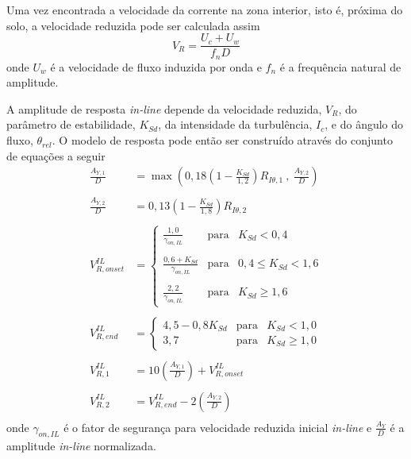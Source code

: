 Uma vez encontrada a velocidade da corrente na zona interior, isto é, próxima do solo, a velocidade reduzida pode ser calculada assim
\begin{equation}
\label{eq:jdsn-Vr}
V_R = \frac{U_c + U_w}{f_n D}
\end{equation}
onde $U_w$ é a velocidade de fluxo induzida por onda e $f_n$ é a frequência natural de amplitude.

A amplitude de resposta \textit{in-line} depende da velocidade reduzida, $V_R$, do parâmetro de estabilidade, $K_\mathit{Sd}$, da intensidade da turbulência, $\mathit{I}_c$, e do ângulo do fluxo, $\theta_\mathit{rel}$.
O modelo de resposta pode então ser construído através do conjunto de equações a seguir
\begin{equation}
\label{eq:jdsn-Vronset}
\begin{aligned}
\frac{A_{Y,1}}{D} &= \max\left(0,18 \left(1 - \frac{K_\mathit{Sd}}{1,2}\right) R_{I\theta,1} ~,~\frac{A_{Y,2}}{D}\right)\\
\\
\frac{A_{Y,2}}{D} &= 0,13 \left(1 - \frac{K_\mathit{Sd}}{1,8}\right) R_{I\theta,2}\\
\\
V_{R,\mathit{onset}}^\mathit{IL} &= \left\{
\begin{array}{ccc}
\frac{1,0}{ \gamma_{\mathit{on}, \mathit{IL}} }               & \mathrm{para} & K_\mathit{Sd} < 0,4\\
\\
\frac{0,6 + K_\mathit{Sd}}{\gamma_{\mathit{on}, \mathit{IL}}} & \mathrm{para} & 0,4 \leq K_\mathit{Sd} < 1,6 \\
\\
\frac{2,2}{\gamma_{\mathit{on}, \mathit{IL}}}                 & \mathrm{para} & K_\mathit{Sd} \geq 1,6
\end{array}
\right.\\
\\
V_{R, \mathit{end}}^\mathit{IL} &=
\left\{
\begin{array}{ccc}
4,5 - 0,8 K_\mathit{Sd} & \mathrm{para} & K_\mathit{Sd} < 1,0 \\
3,7                     & \mathrm{para} & K_\mathit{Sd} \geq 1,0
\end{array}
\right.\\
\\
V_{R, 1}^\mathit{IL} &= 10 \left(\frac{A_{Y, 1}}{D}\right)+ V_{R,\mathit{onset}}^\mathit{IL}\\
\\
V_{R, 2}^\mathit{IL} &=  V_{R, \mathit{end}}^\mathit{IL} - 2 \left(\frac{A_{Y, 2}}{D}\right)\\
\end{aligned}
\end{equation}
onde $\gamma_{\mathit{on}, \mathit{IL}}$ é o fator de segurança para velocidade reduzida inicial \textit{in-line} e $\frac{A_Y}{D}$ é a amplitude \textit{in-line} normalizada.

